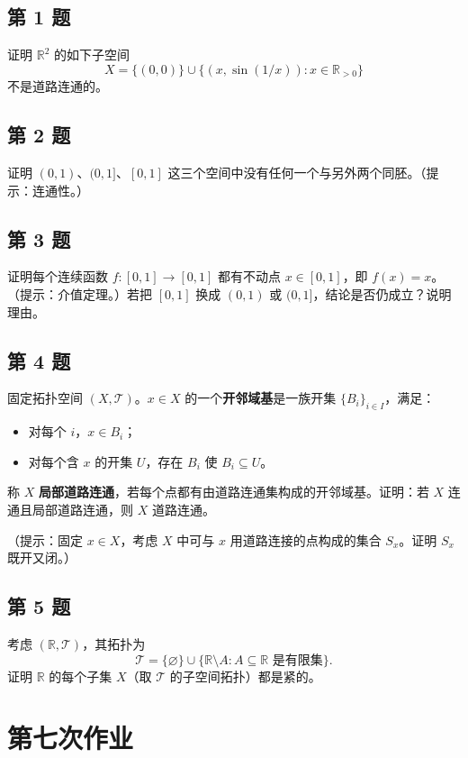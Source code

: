 \documentclass[11pt,a4paper]{article}
\newcommand{\R}{\mathbb{R}}
\theoremstyle{definition}
\begin{document}
\subsection{第 1 题}

证明 $\R^2$ 的如下子空间
\[
  X = \{(0,0)\} \cup \{(x,\sin(1/x)) : x \in \R_{>0}\}
\]
不是道路连通的。

\subsection{第 2 题}

证明 $(0,1)$、$(0,1]$、$[0,1]$ 这三个空间中没有任何一个与另外两个同胚。（提示：连通性。）

\subsection{第 3 题}

证明每个连续函数 $f : [0,1] \to [0,1]$ 都有不动点 $x \in [0,1]$，即 $f(x) = x$。（提示：介值定理。）若把 $[0,1]$ 换成 $(0,1)$ 或 $(0,1]$，结论是否仍成立？说明理由。

\subsection{第 4 题}

固定拓扑空间 $(X, \mathcal{T})$。$x \in X$ 的一个\textbf{开邻域基}是一族开集 $\{B_i\}_{i \in I}$，满足：
\begin{itemize}
  \item 对每个 $i$，$x \in B_i$；
  \item 对每个含 $x$ 的开集 $U$，存在 $B_i$ 使 $B_i \subseteq U$。
\end{itemize}
称 $X$ \textbf{局部道路连通}，若每个点都有由道路连通集构成的开邻域基。证明：若 $X$ 连通且局部道路连通，则 $X$ 道路连通。

（提示：固定 $x \in X$，考虑 $X$ 中可与 $x$ 用道路连接的点构成的集合 $S_x$。证明 $S_x$ 既开又闭。）

\subsection{第 5 题}

考虑 $(\R, \mathcal{T})$，其拓扑为
\[
  \mathcal{T} = \{\varnothing\} \cup \{\R \setminus A : A \subseteq \R \text{ 是有限集}\}.
\]
证明 $\R$ 的每个子集 $X$（取 $\mathcal{T}$ 的子空间拓扑）都是紧的。

\section{第七次作业}
\end{document}
